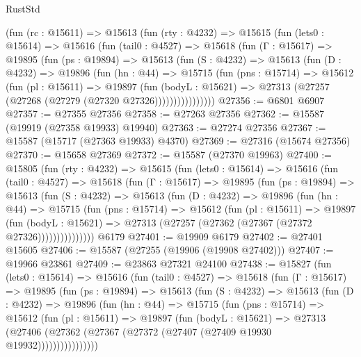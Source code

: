 \begin{lexlean}{RustStd}
\begin{coremodule}
    (fun (rc : @15611) =>
    @15613
      (fun (rty : @4232) =>
      @15615
        (fun (lets0 : @15614) =>
        @15616
          (fun (tail0 : @4527) =>
          @15618
            (fun (Γ : @15617) =>
            @19895
              (fun (ps : @19894) =>
              @15613
                (fun (S : @4232) =>
                @15613
                  (fun (D : @4232) =>
                  @19896
                    (fun (hn : @44) =>
                    @15715
                      (fun (pns : @15714) =>
                      @15612
                        (fun (pl : @15611) =>
                        @19897
                          (fun (bodyL : @15621) =>
                          @27313 (@27257 (@27268 (@27279 (@27320 @27326))))))))))))))))
@27356 := @6801 @6907
@27357 := @27355 @27356
@27358 := @27263 @27356
@27362 := @15587 (@19919 (@27358 @19933) @19940)
@27363 := @27274 @27356
@27367 := @15587 (@15717 (@27363 @19933) @4370)
@27369 := @27316 (@15674 @27356)
@27370 := @15658 @27369
@27372 := @15587 (@27370 @19963)
@27400 := @15805
    (fun (rty : @4232) =>
    @15615
      (fun (lets0 : @15614) =>
      @15616
        (fun (tail0 : @4527) =>
        @15618
          (fun (Γ : @15617) =>
          @19895
            (fun (ps : @19894) =>
            @15613
              (fun (S : @4232) =>
              @15613
                (fun (D : @4232) =>
                @19896
                  (fun (hn : @44) =>
                  @15715
                    (fun (pns : @15714) =>
                    @15612
                      (fun (pl : @15611) =>
                      @19897
                        (fun (bodyL : @15621) =>
                        @27313 (@27257 (@27362 (@27367 (@27372 @27326)))))))))))))))
    @6179
@27401 := @19909 @6179
@27402 := @27401 @15605
@27406 := @15587 (@27255 (@19906 (@19908 @27402)))
@27407 := @19966 @23861
@27409 := @23863 @27321 @24100
@27438 := @15827
    (fun (lets0 : @15614) =>
    @15616
      (fun (tail0 : @4527) =>
      @15618
        (fun (Γ : @15617) =>
        @19895
          (fun (ps : @19894) =>
          @15613
            (fun (S : @4232) =>
            @15613
              (fun (D : @4232) =>
              @19896
                (fun (hn : @44) =>
                @15715
                  (fun (pns : @15714) =>
                  @15612
                    (fun (pl : @15611) =>
                    @19897
                      (fun (bodyL : @15621) =>
                      @27313
                        (@27406
                          (@27362 (@27367 (@27372 (@27407 (@27409 @19930 @19932))))))))))))))))

\end{coremodule}
\end{lexlean}
